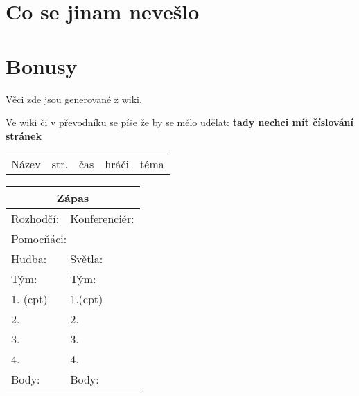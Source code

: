 \documentclass[a4paper,10pt,openany]{book}
\newcommand{\todo}[1]{

Ve wiki či v převodníku se píše že by se mělo udělat: \textbf{#1} 

}
\begin{document}


\chapter{Co se jinam nevešlo}\label{co se jinam nevešlo}


\chapter{Bonusy}
Věci zde jsou generované z wiki.
\todo{tady nechci mít číslování stránek}
\pagebreak
\newcommand{\btbinfo}[6]{

\ifx Z#6 \textbf{#1} \else #1 \small{  (i)} \fi   & \pageref{#2} &  \small{#3} & \small{#4} & \small{#5}\hline
}
\thispagestyle{empty} 
\begin{longtable}{|p{4cm}|p{.4cm}|p{3.2cm}|p{3cm}|p{4.2cm}|}
Název&str.&čas&hráči&téma \hline 


\end{longtable}
\thispagestyle{empty} 
\pagebreak
\thispagestyle{empty} 
\renewcommand{\btbinfo}[6]{
\ifx Z#6 \large{#1}   \fi

} 



\begin{multicols}{2}

 \begin{tabular}[t]{|p{4cm}|p{4cm}    |}
 \hline 
 \multicolumn{2}{|c|}{\large{Zápas}} \\
  \hline
Rozhodčí:  & Konferenciér: \\
 \hline
\multicolumn{2}{|l|}{ Pomocňáci: }   \\ \hline
Hudba: & Světla: \\ \hline \hline
Tým: &  Tým:\\ \hline
1. \small{(cpt)}  & 1.\small{(cpt)} \\ \hline
2.  & 2. \\ \hline
3. & 3. \\ \hline
4.  & 4. \\ \hline
Body:  & Body: \\ \hline


\end{tabular}



\end {multicols}
\thispagestyle{empty} 
\renewcommand{\btbinfo}[6]{
\ifx Z#6  \else \large{#1}  \fi

}
\begin{multicols}{2}

\end {multicols}
\pagebreak
\thispagestyle{empty} 
\newcommand{\faulinfo}[5]{
#4 & #1 & #3 & #5 \\

}

\begin{tabular}[t]{|p{3cm}|p{4cm}|p{1cm}|p{6cm}    |}

\end{tabular}

\setcounter{tocdepth}{1}
\tableofcontents
\end{document}
